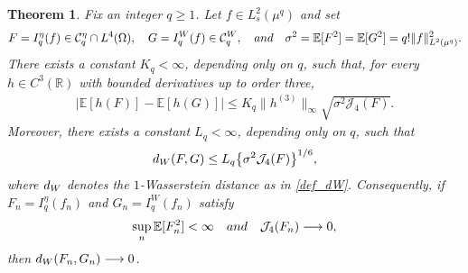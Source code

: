 \documentclass[10pt,a4paper]{amsart}
\newtheorem{theorem}{Theorem}
\newcommand{\AND}{\quad{\rm and}\quad}
\newcommand{\E}{\mathbb{E}}
\newcommand{\Jfour}{\mathcal J_4}
\newcommand{\R}{\mathbb{R}}
\newcommand{\cC}{\mathcal{C}}
\newcommand{\dW}{d_{\rm W}}
\newcommand{\noi}{\noindent}
\begin{document}
\begin{theorem}
\label{thm4}
Fix an integer $q\geq1$.  Let $f\in L_s^2(\mu^q)$ and set
\noi
\begin{align*}
 F=I_q^\eta(f)\in\cC_q^\eta\cap L^4(\Omega),
 \quad
 G=I_q^W(f)\in\cC_q^W,
 \AND
 \sigma^2=\E[F^2]=\E[G^2]
 =q!\|f\|_{L^2(\mu^q)}^2.
\end{align*}
There exists a constant $K_q<\infty$, depending only on $q$, such
that, for every $h\in C^3(\R)$ with bounded derivatives up to order
three,
\noi
\begin{align}
 \left|\E[h(F)]-\E[h(G)]\right|
 \leq
 K_q\|h^{(3)}\|_\infty
 \sqrt{\sigma^2\Jfour(F)}.
 \label{thm5_1}
\end{align}
Moreover, there exists a constant $L_q<\infty$, depending only on
$q$, such that
\noi
\begin{align}
 \dW(F,G)
 \leq
 L_q\bigl\{\sigma^2\Jfour(F)\bigr\}^{1/6},
 \label{thm5_2}
\end{align}
where $\dW$ denotes the $1$-Wasserstein distance as in \eqref{def_dW}.
Consequently, if $F_n=I_q^\eta(f_n)$
and
 $G_n=I_q^W(f_n)$
satisfy
\noi
\begin{align} 
 \sup_n\E[F_n^2]<\infty
 \AND
 \Jfour(F_n)\longrightarrow0,
  \notag%
\end{align}
then $\dW(F_n,G_n)\longrightarrow0$.

\end{theorem}
\end{document}

